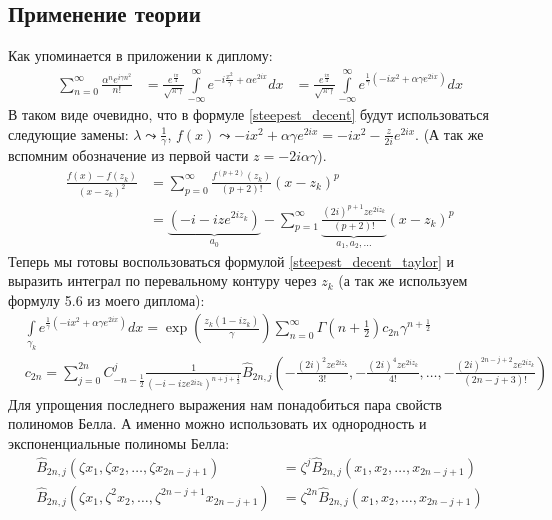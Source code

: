 \documentclass[a4paper, 12pt]{article}
\begin{document}
\subsection*{Применение теории}
Как упоминается в приложении к диплому:
\begin{equation}
\begin{aligned}
    \sum\limits_{n=0}^{\infty} \frac{\alpha^n e^{i\gamma n^2}}{n!} 
    &= \frac{e^{\frac{i\pi}{4}}}{\sqrt{\pi\gamma}}
    \int\limits_{-\infty}^{\infty}e^{-i \frac{x^2}{\gamma} + \alpha e^{2ix}}dx
    &= \frac{e^{\frac{i\pi}{4}}}{\sqrt{\pi\gamma}}
    \int\limits_{-\infty}^{\infty}e^{\frac{1}{\gamma}\left(-i x^2 + \alpha \gamma e^{2ix}\right)}dx
\end{aligned}
\end{equation}
В таком виде очевидно, что в формуле \ref{steepest_decent} будут использоваться следующие замены: $\lambda\leadsto\frac{1}{\gamma}$, $f(x) \leadsto -i x^2 + \alpha \gamma e^{2ix} = -i x^2 - \frac{z}{2i} e^{2ix}$. (А так же вспомним обозначение из первой части $z=-2i\alpha\gamma$).
\begin{equation}
\begin{aligned}
    \frac{f(x) - f(z_k)}{(x-z_k)^2} 
    &=  \sum\limits_{p=0}^{\infty} \frac{f^{(p+2)}(z_k)}{(p+2)!}(x-z_k)^{p}\\
    &=  \underbrace{\left(-i - iz e^{2iz_k}\right)}_{a_0} - \sum\limits_{p=1}^{\infty} \underbrace{\frac{(2i)^{p+1}ze^{2iz_k}}{(p+2)!}}_{a_1, a_2, \dots}(x-z_k)^{p}
\end{aligned}
\end{equation}
Теперь мы готовы воспользоваться формулой \ref{steepest_decent_taylor} и выразить интеграл по перевальному контуру через $z_k$ (а так же используем формулу 5.6 из моего диплома):
\begin{equation}
\begin{aligned}
    &\int\limits_{\gamma_k}e^{\frac{1}{\gamma}\left(-i x^2 + \alpha \gamma e^{2ix}\right)}dx 
    = \exp\left(\frac{z_k(1-i z_k)}{\gamma}\right)\sum\limits_{n=0}^{\infty} \Gamma\left(n+\frac{1}{2}\right)c_{2n}\gamma^{n+\frac{1}{2}}\\
    &c_{2n} =
    \sum\limits_{j=0}^{2n} C_{-n-\frac{1}{2}}^j\frac{1}{\left(-i - iz e^{2iz_k}\right)^{n+j+\frac{1}{2}}}
    \hat{B}_{2n, j}\left(-\frac{(2i)^{2}ze^{2iz_k}}{3!}, -\frac{(2i)^{4}ze^{2iz_k}}{4!}, \dots, -\frac{(2i)^{2n-j+2}ze^{2iz_k}}{(2n-j+3)!}\right)
\end{aligned}
\end{equation}
Для упрощения последнего выражения нам понадобиться пара свойств полиномов Белла. А именно можно использовать их однородность и экспоненциальные полиномы Белла:
\begin{equation}
\begin{aligned}
    \hat{B}_{2n, j}(\zeta x_1, \zeta x_2, \dots, \zeta x_{2n-j+1}) &= \zeta^j \hat{B}_{2n, j}( x_1,  x_2, \dots,  x_{2n-j+1})\\
    \hat{B}_{2n, j}(\zeta x_1, \zeta^2 x_2, \dots, \zeta^{2n-j+1} x_{2n-j+1}) &= \zeta^{2n} \hat{B}_{2n, j}( x_1,  x_2, \dots,  x_{2n-j+1})
\end{aligned}
\end{equation}
\end{document}
